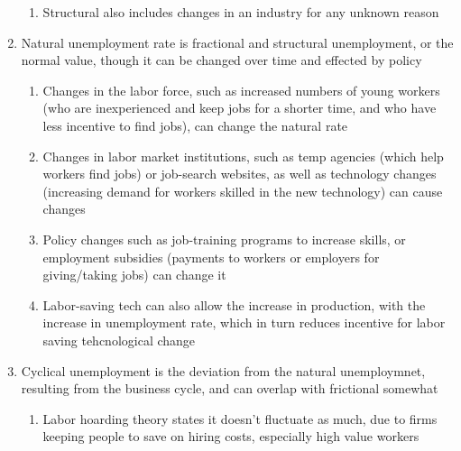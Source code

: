 \documentclass[11 pt, twoside]{article}
\begin{document}
\begin{enumerate}
\begin{enumerate}
\item Structural also includes changes in an industry for any unknown reason
\end{enumerate}
\item Natural unemployment rate is fractional and structural unemployment, or the normal value, though it can be changed over time and effected by policy
\begin{enumerate}
\item Changes in the labor force, such as increased numbers of young workers (who are inexperienced and keep jobs for a shorter time, and who have less incentive to find jobs), can change the natural rate
\item Changes in labor market institutions, such as temp agencies (which help workers find jobs) or job-search websites, as well as technology changes (increasing demand for workers skilled in the new technology) can cause changes
\item Policy changes such as job-training programs to increase skills, or employment subsidies (payments to workers or employers for giving/taking jobs) can change it
\item Labor-saving tech can also allow the increase in production, with the increase in unemployment rate, which in turn reduces incentive for labor saving tehcnological change
\end{enumerate}
\item Cyclical unemployment is the deviation from the natural unemploymnet, resulting from the business cycle, and can overlap with frictional somewhat
\begin{enumerate}
\item Labor hoarding theory states it doesn't fluctuate as much, due to firms keeping people to save on hiring costs, especially high value workers
\end{enumerate}
\end{enumerate}
\end{document}

